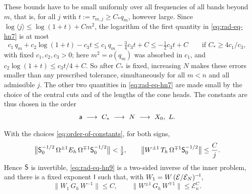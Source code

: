 These bounds have to be small uniformly over all frequencies of all
bands beyond $m$, that is, for all $j$ with
$t:=\tau_{m,j}\ge C_*q_m$, however large. Since
$\log\langle j\rangle\le\log(1+t)+Cm^2$, the logarithm of the first
quantity in \eqref{eq:rad-eq-hn7} is at most
\begin{equation}\label{eq:inner-uniform-suppression}
 c_1\,q_m+c_2\log(1+t)-c_3t
 \le c_1\,q_m-\tfrac34c_3t+C
 \le-\tfrac12c_3t+C
 \qquad\text{if }C_*\ge4c_1/c_3,
\end{equation}
with fixed $c_1,c_2,c_3>0$; here $m^2=o(q_m)$ was absorbed in $c_1$, and
$c_2\log(1+t)\le c_3t/4+C$. So after $C_*$ is fixed, increasing $N$
makes these errors smaller than any prescribed tolerance,
simultaneously for all $m<n$ and all admissible $j$. The other two
quantities in \eqref{eq:rad-eq-hn7} are made small by the choice of
the central cuts and of the lengths of the cone heads. The constants
are thus chosen in the order
\begin{equation}\label{eq:order-of-constants}
 \mathsf a\ \longrightarrow\ C_*\ \longrightarrow\ N\ \longrightarrow\
 X_0,\ L .
\end{equation}

\begin{lemma}\label{lem:inner-inverse}
With the choices \eqref{eq:order-of-constants}, for both signs,
\begin{equation}\label{eq:rad-eq-hn8}
 \bigl\|\mathsf S_0^{-1/2}\,\Omega^{\pm1}E_h\,\Omega^{\mp1}\mathsf S_0^{-1/2}\bigr\|
 <\tfrac12,
 \qquad
 \bigl\|W^{\pm1}\,T_h\,\Omega^{\mp1}\mathsf S_0^{-1/2}\bigr\|\le\frac Cj .
\end{equation}
Hence $\mathsf S$ is invertible, \eqref{eq:rad-eq-hn9} is a two-sided
inverse of the inner problem, and there is a fixed exponent $\mathsf l$ such
that, with $W_1=W\,(\mathcal E/\mathcal E_N)^{-\mathsf l}$,
\begin{equation}\label{eq:inner-inverse-estimates-new}
 \|W_1\,G_h\,W^{-1}\|\le C,\qquad
 \|W^{\pm1}\,G_h\,W^{\mp1}\|\le\mathcal E_n^C .
\end{equation}
\end{lemma}

